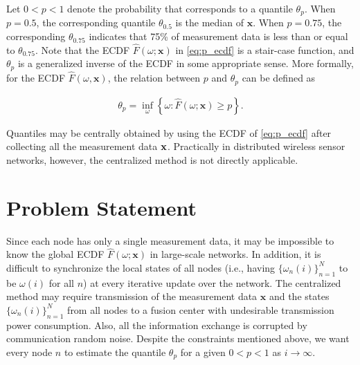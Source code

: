 \documentclass[journal]{IEEEtran}
\begin{document}
Let $0 < p < 1$ denote the probability that corresponds to a quantile $\theta_p$. When $p = 0.5$, the corresponding quantile $\theta_{0.5}$ is the median of $\mathbf{x}$. When $p=0.75$, the corresponding $\theta_{0.75}$ indicates that 75\% of measurement data is less than or equal to $\theta_{0.75}$. Note that the ECDF $\widehat{F}(\omega;\mathbf{x})$ in \eqref{eq:p_ecdf} is a stair-case function, and $\theta_p$ is {}{a generalized} inverse of the ECDF in some {}{appropriate} sense. More formally, for the ECDF $\widehat{F}(\omega,\mathbf{x})$, the relation between $p$ and $\theta_p$ can be defined \cite{Hyndman1996} as

\vspace{-4mm}
\small
\begin{align}
\theta_p =  \inf_\omega \left\{\omega: \widehat{F}(\omega;\mathbf{x}) \ge p \right\}. \label{eq:theta_p}
\end{align}
\normalsize
%
%

Quantiles may be centrally obtained by using the ECDF of \eqref{eq:p_ecdf} after collecting all the measurement data $\bf{x}$. Practically in distributed wireless sensor networks, however, the centralized method is not directly applicable.

\vspace{-1mm}
\section{Problem Statement} \label{problem_statement} 
Since each node has only a single measurement data, it may be impossible to know the global ECDF $\widehat{F}(\omega;\mathbf{x})$ in large-scale networks. In addition, it is difficult to synchronize the local states of all nodes (i.e., having $\{\omega_n(i)\}_{n=1}^N$ to be $\omega(i)$ for all $n$) at every iterative update over the network. The centralized method may require transmission of the measurement data $\mathbf{x}$ and the states $\{\omega_n(i)\}_{n=1}^N$ from all nodes to a fusion center with undesirable transmission power consumption. Also, all the information exchange is corrupted by communication random noise. Despite the constraints mentioned above, we want every node $n$ to estimate the quantile $\theta_p$ for a given {}{$0<p<1$} as $i \to \infty$.
\end{document}
